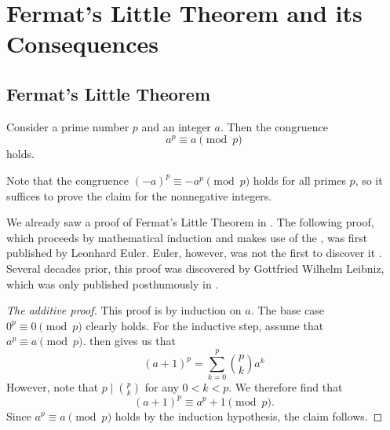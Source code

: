 \chapter{Fermat's Little Theorem and its Consequences}\label{chapter:modular-arithmetic}

\section{Fermat's Little Theorem}

\begin{theorem}\label{theorem:fermats-little-theorem}
  Consider a prime number $p$ and an integer $a$. Then the congruence
  \begin{equation*}
    a^{p}\equiv a\pmod{p}
  \end{equation*}
  holds.
\end{theorem}

\begin{remark}
  Note that the congruence $(-a)^p\equiv -a^p\pmod{p}$ holds for all primes $p$, so it suffices to prove the claim for the nonnegative integers.
\end{remark}

We already saw a proof of Fermat's Little Theorem in . The following proof, which proceeds by mathematical induction and makes use of the , was first published by Leonhard Euler. Euler, however, was not the first to discover it \cite[p.~59]{dickson1919}. Several decades prior, this proof was discovered by Gottfried Wilhelm Leibniz, which was only published posthumously in \cite{leibniz1863}.

\begin{proof}[The additive proof]
  This proof is by induction on $a$. The base case $0^p\equiv 0\pmod{p}$ clearly holds. For the inductive step, assume that $a^p\equiv a\pmod{p}$.  then gives us that
  \begin{equation*}
    (a+1)^p=\sum_{k=0}^p \binom{p}{k}a^k
  \end{equation*}
  However, note that $p\mid\binom{p}{k}$ for any $0<k<p$. We therefore find that
  \begin{equation*}
    (a+1)^p\equiv a^p+1\pmod{p}.
  \end{equation*}
  Since $a^p\equiv a\pmod{p}$ holds by the induction hypothesis, the claim follows.
\end{proof}

